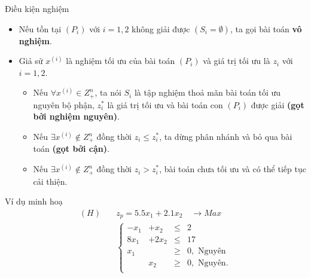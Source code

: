 \documentclass[10pt]{beamer}
\newtheorem{cy}{Chú ý}[section]
\begin{document}
\begin{frame}{Điều kiện nghiệm}
\begin{itemize}
\item<1-> Nếu tồn tại $(P_i)$ với $i=1,2$ không giải được $(S_i = \emptyset )$, ta gọi bài toán \textbf{vô nghiệm}.
\medskip
\item<2-> Giả sử $x^{(i)}$ là nghiệm tối ưu của bài toán $(P_i)$ và giá trị tối ưu là $z_i$ với $i = 1,2$.
\begin{itemize}
\item<3-> Nếu $\forall x^{(i)} \in Z^n_+$, ta nói $S_i$ là tập nghiệm thoả mãn bài toán tối ưu nguyên bộ phận, $z^*_i$ là giá trị tối ưu và bài toán con $(P_i)$ được giải \textbf{(gọt bởi nghiệm nguyên)}.
\item<4-> Nếu $\exists x^{(i)} \notin Z^n_+$ đồng thời $z_i \leq z^*_i$, ta dừng phân nhánh và bỏ qua bài toán \textbf{(gọt bởi cận)}.
\item<5-> Nếu $\exists x^{(i)} \notin Z^n_+$ đồng thời $z_i > z^*_i$, bài toán chưa tối ưu và có thể tiếp tục cải thiện.
\end{itemize}
\end{itemize}
\medskip
{}
\end{frame}

\begin{frame}{Ví dụ minh hoạ}
    \begin{equation*}
        \begin{split}
            (H) \quad &z_p= 5.5x_1 + 2.1x_2 \quad \longrightarrow Max \\
            & \left\{\begin{array}{cccc}
            -x_1 &+ x_2 &\leq& 2 \\
            8x_1 &+ 2x_2 &\leq& 17 \\
            x_1 &&\geq& 0, \text{ Nguyên}\\
            &x_2 &\geq& 0, \text{ Nguyên}. \\
            \end{array}\right. \\
        \end{split}
    \end{equation*}
\end{frame}
\end{document}
